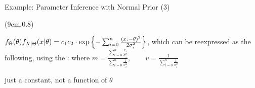 \begin{frame}{Example: Parameter Inference with Normal Prior (3)}

  \begin{textblock*}{\textwidth}(9cm,0.8\textheight)
  \end{textblock*}


  \plitemsep 0.03in
  \bci
  
\item<2->  $f_\Theta(\theta) f_{X|\Theta}(x|\theta) = c_1c_2\cdot \exp \left\{ -
    \sum_{i=0}^n \frac{(x_i - \theta)^2}{2 \sigma_i^2}  \right\}$,
  which can be reexpressed as the following, using the :
  where
$
\displaystyle
    m = \frac
    {\sum_{i=0}^n \frac{x_i}{\sigma_i^2}}
    {\sum_{i=0}^n \frac{1}{\sigma_i^2}}, \qquad v =
    \frac{1}{\sum_{i=0}^n \frac{1}{\sigma_i^2}}
$
  

\item<3->  just a constant, not a function of $\theta$

  \eci

\end{frame}

